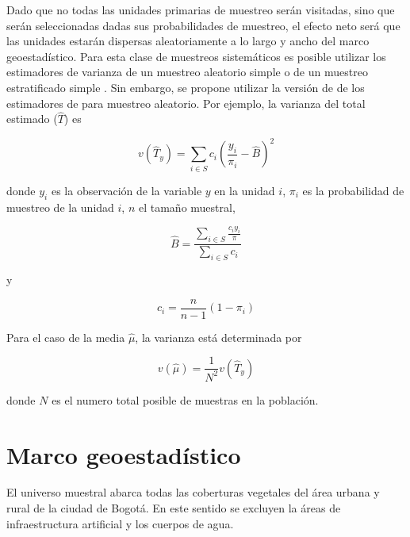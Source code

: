 \documentclass[12pt,letterpaper]{article}
\begin{document}
Dado que no todas las unidades primarias de muestreo ser\'an visitadas, sino que ser\'an seleccionadas dadas sus probabilidades de muestreo, el efecto neto ser\'a que las unidades estar\'an dispersas aleatoriamente a lo largo y ancho del marco geoestad\'istico. Para esta clase de muestreos sistem\'aticos es posible utilizar los estimadores de varianza de un muestreo aleatorio simple o de un muestreo estratificado simple \citep{lohr2022}. %
Sin embargo, se propone utilizar la versión de \citet{hajek1964} de los estimadores de \citet{horvitz1952} para muestreo aleatorio. Por ejemplo, la varianza del total estimado ($\hat{T}$) es

$$ v(\hat{T}_y) = \sum_{i \in S} c_i \left( \frac{y_i}{\pi_i} - \hat{B} \right)^2 $$

donde $y_i$ es la observaci\'on de la variable $y$ en la unidad $i$, $\pi_i$ es la probabilidad de muestreo de la unidad $i$, $n$ el tamaño muestral,

$$ \hat{B} = \frac{\sum_{i \in S} \frac{c_i y_i}{\pi} }{ \sum_{i \in S} c_i} $$

y

$$ c_i = \frac{n}{n-1}(1 - \pi_i) $$

Para el caso de la media $\hat{\mu}$, la varianza est\'a determinada por 

$$ v(\hat{\mu}) = \frac{1}{N^2} v(\hat{T}_y) $$

donde $N$ es el numero total posible de muestras en la población.

\section*{Marco geoestadístico}

El universo muestral abarca todas las coberturas vegetales del \'area urbana y rural de la ciudad de Bogot\'a.
En este sentido se excluyen la áreas de infraestructura artificial y los cuerpos de agua.
\end{document}

